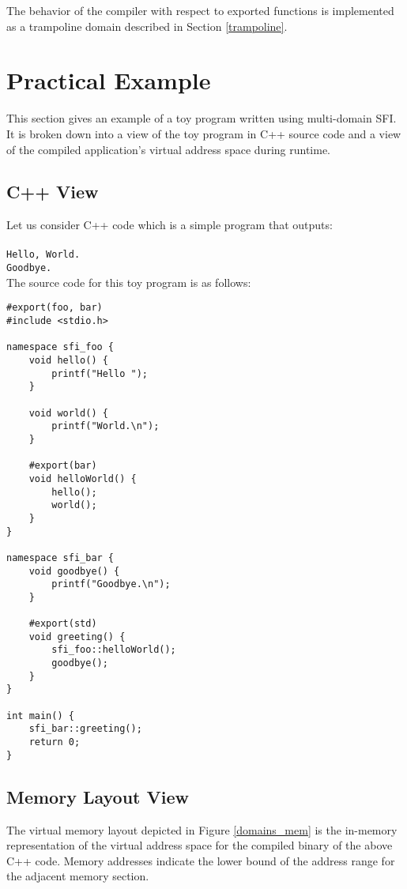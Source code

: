 \documentclass[12pt]{article}
\begin{document}
The behavior of the compiler with respect to exported functions is implemented as a trampoline domain described in Section \ref{trampoline}.

\section{Practical Example}

This section gives an example of a toy program written using multi-domain SFI. It is broken down into a view of the toy program in C++ source code and a view of the compiled application's virtual address space during runtime.
\subsection{C++ View}

Let us consider C++ code which is a simple program that outputs:\\ \\
\texttt{Hello, World.\\Goodbye.}\\

\noindent The source code for this toy program is as follows:

\begin{verbatim}
#export(foo, bar)
#include <stdio.h>

namespace sfi_foo {
	void hello() {
		printf("Hello ");
	}
	
	void world() {
		printf("World.\n");
	}
	
	#export(bar)
	void helloWorld() {
		hello();
		world();
	}
}

namespace sfi_bar {
	void goodbye() {
		printf("Goodbye.\n");
	}
	
	#export(std)
	void greeting() {
		sfi_foo::helloWorld();
		goodbye();
	}
}

int main() {
	sfi_bar::greeting();
	return 0;
}

\end{verbatim}

\subsection{Memory Layout View}

The virtual memory layout depicted in Figure \ref{domains_mem} is the in-memory representation of the virtual address space for the compiled binary of the above C++ code. Memory addresses indicate the lower bound of the address range for the adjacent memory section.\\
\end{document}
